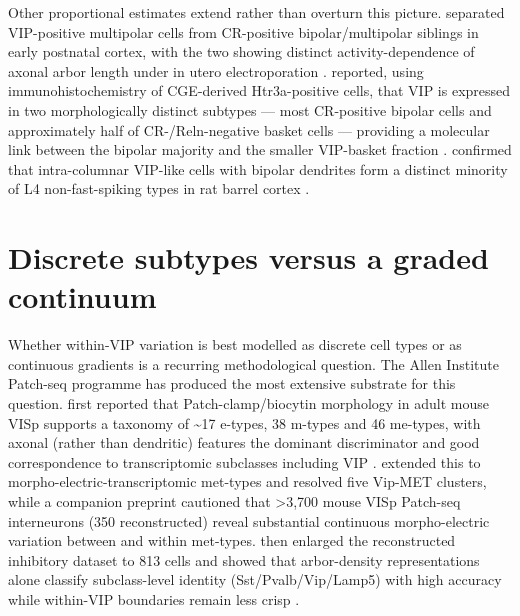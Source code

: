 \documentclass[11pt]{article}
\begin{document}
Other proportional estimates extend rather than overturn this picture. \citet{Demarcogarcia2011} separated VIP-positive multipolar cells from CR-positive bipolar/multipolar siblings in early postnatal cortex, with the two showing distinct activity-dependence of axonal arbor length under in utero electroporation \citep{Demarcogarcia2011, Stachniak2021, Wong2022, Fishell2020}. \citet{Wong2022} reported, using immunohistochemistry of CGE-derived Htr3a-positive cells, that VIP is expressed in two morphologically distinct subtypes --- most CR-positive bipolar cells and approximately half of CR-/Reln-negative basket cells --- providing a molecular link between the bipolar majority and the smaller VIP-basket fraction \citep{Wong2022, Stachniak2021, Rudy2011, Yayon2023}. \citet{Emmenegger2018} confirmed that intra-columnar VIP-like cells with bipolar dendrites form a distinct minority of L4 non-fast-spiking types in rat barrel cortex \citep{Emmenegger2018, Pronneke2015, Cauli1997, Apicella2022}.

\section{Discrete subtypes versus a graded continuum}

Whether within-VIP variation is best modelled as discrete cell types or as continuous gradients is a recurring methodological question. The Allen Institute Patch-seq programme has produced the most extensive substrate for this question. \citet{Gouwens2019} first reported that Patch-clamp/biocytin morphology in adult mouse VISp supports a taxonomy of {\textasciitilde}17 e-types, 38 m-types and 46 me-types, with axonal (rather than dendritic) features the dominant discriminator and good correspondence to transcriptomic subclasses including VIP \citep{Gouwens2019, Gouwens2020a, Gliko2024, Schneidermizell2025}. \citet{Gouwens2020a} extended this to morpho-electric-transcriptomic met-types and resolved five Vip-MET clusters, while a companion preprint \citep{Gouwens2020b, Gouwens2019, Gliko2024, Pronneke2015} cautioned that \textgreater 3,700 mouse VISp Patch-seq interneurons (350 reconstructed) reveal substantial continuous morpho-electric variation between and within met-types. \citet{Gliko2024} then enlarged the reconstructed inhibitory dataset to 813 cells and showed that arbor-density representations alone classify subclass-level identity (Sst/Pvalb/Vip/Lamp5) with high accuracy while within-VIP boundaries remain less crisp \citep{Gliko2024, Gouwens2020a, Gouwens2020b, Elabbady2025}.
\end{document}

